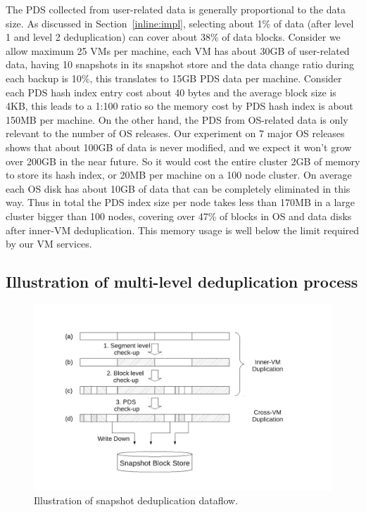The PDS collected from user-related data is generally proportional to the data size.
As discussed in Section~\ref{inline:impl}, selecting about 1\% of data (after level 1 and level 2 deduplication)
can cover about 38\% of data blocks. Consider we allow maximum 25 VMs per machine, each VM has
about 30GB of user-related data, having 10 snapshots in its snapshot store and the data change ratio during
each backup is 10\%, this translates to 15GB PDS data per machine. 
Consider each PDS hash index entry cost about 40 bytes and the average block size is 4KB, this leads to
a 1:100 ratio so the 
memory cost by PDS hash index is about 150MB per machine.
On the other hand, the PDS from OS-related data is only relevant to the number of OS releases.
Our experiment on 7 major OS releases shows that about 100GB of data is never modified, and we expect
it won't grow over 200GB in the near future. So it would cost the entire cluster 2GB of memory to
store its hash index, or 20MB per machine on a 100 node cluster. On average each OS disk has about 10GB
of data that can be completely eliminated in this way.
Thus in total the PDS index size per node takes less than 170MB in a large cluster bigger than 100 nodes, 
covering over 47\% of blocks in OS and data disks after inner-VM deduplication.
This memory usage is well below the limit required by our VM services.

\subsection{Illustration of multi-level deduplication process}

%
\begin{figure}
  \centering
  \includegraphics[width=5in]{images/dedup_flow2.pdf}
  \caption{Illustration of snapshot deduplication dataflow.}
  \label{fig:dedupflow}
\end{figure}

